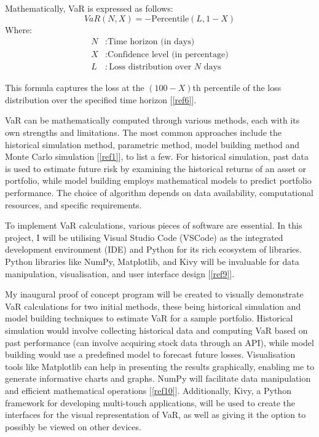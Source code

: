 \documentclass{article}
\begin{document}
Mathematically, VaR is expressed as follows:
\begin{equation}
VaR(N, X) = -\text{Percentile}(L, 1 - X)
\end{equation}
Where:
\begin{align*}
N & : \text{Time horizon (in days)} \\
X & : \text{Confidence level (in percentage)} \\
L & : \text{Loss distribution over } N \text{ days}
\end{align*}

This formula captures the loss at the \((100-X)\)th percentile of the loss distribution over the specified time horizon [\ref{ref6}]. \\\vspace{0.3cm}

VaR can be mathematically computed through various methods, each with its own strengths and limitations. The most common approaches include the historical simulation method, parametric method, model building method and Monte Carlo simulation [\ref{ref1}], to list a few. For historical simulation, past data is used to estimate future risk by examining the historical returns of an asset or portfolio, while model building employs mathematical models to predict portfolio performance. The choice of algorithm depends on data availability, computational resources, and specific requirements.\\\vspace{0.3cm}

To implement VaR calculations, various pieces of software are essential. In this project, I will be utilising Visual Studio Code (VSCode) as the integrated development environment (IDE) and Python for its rich ecosystem of libraries. Python libraries like NumPy, Matplotlib, and Kivy will be invaluable for data manipulation, visualisation, and user interface design [\ref{ref9}].\\\vspace{0.3cm}

My inaugural proof of concept program will be created to visually demonstrate VaR calculations for  two initial methods, these being historical simulation and model building techniques to estimate VaR for a sample portfolio. Historical simulation would involve collecting historical data and computing VaR based on past performance (can involve acquiring stock data through an API), while model building would use a predefined model to forecast future losses. Visualisation tools like Matplotlib can help in presenting the results graphically, enabling me to generate informative charts and graphs. NumPy will facilitate data manipulation and efficient mathematical operations [\ref{ref10}]. Additionally, Kivy, a Python framework for developing multi-touch applications, will be used to create the interfaces for the visual representation of VaR, as well as giving it the option to possibly be viewed on other devices.\\\vspace{0.3cm}
\end{document}
